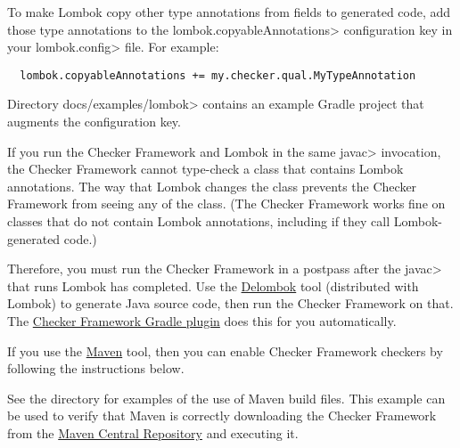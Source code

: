To make Lombok copy other type annotations from fields to generated code,
add those type annotations to the \<lombok.copyableAnnotations>
configuration key in your \<lombok.config> file.  For example:

\begin{Verbatim}
  lombok.copyableAnnotations += my.checker.qual.MyTypeAnnotation
\end{Verbatim}

Directory \<docs/examples/lombok> contains an example Gradle project that
augments the configuration key.





If you run the Checker Framework and Lombok in the same \<javac>
invocation, the Checker Framework cannot type-check a class that contains
Lombok annotations.  The way that Lombok changes the class prevents the
Checker Framework from seeing any of the class.  (The Checker Framework
works fine on classes that do not contain Lombok annotations, including if
they call Lombok-generated code.)

Therefore, you must run the Checker Framework in a postpass after the
\<javac> that runs Lombok has completed.  Use the
\href{https://projectlombok.org/features/delombok}{Delombok} tool
(distributed with Lombok) to generate Java source code, then run the
Checker Framework on that.  The
\href{https://github.com/kelloggm/checkerframework-gradle-plugin}{Checker
  Framework Gradle plugin} does this for you automatically.



If you use the \href{http://maven.apache.org/}{Maven} tool,
then you can enable Checker Framework checkers by following the
instructions below.

See the directory  for examples of the use of
Maven build files.
This example can be used to verify that
Maven is correctly downloading the Checker Framework from the
\href{https://search.maven.org/search?q=org.checkerframework}{Maven
  Central Repository} and executing it.

